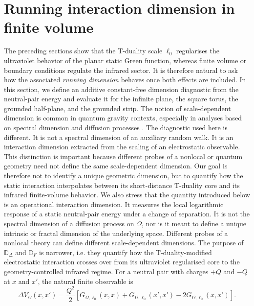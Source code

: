\documentclass[nopacs,amsmath,amsfonts,amssymb,aps,superscriptaddress]{revtex4}
\begin{document}
\section{Running interaction dimension in finite volume}
\label{sec:running_dimension}

The preceding sections show that the T-duality scale $\ell_0$ regularises the ultraviolet behavior of the planar static Green function, whereas finite volume or boundary conditions regulate the infrared sector. It is therefore natural to ask how the associated {\it{running dimension}} behaves once both effects are included. In this section, we define an additive constant-free dimension diagnostic from the neutral-pair energy and evaluate it for the infinite plane, the square torus, the grounded half-plane, and the grounded strip. The notion of scale-dependent dimension is common in quantum gravity contexts, especially in analyses based on spectral dimension and diffusion processes  \cite{AmbjornJurkiewiczLoll2005, Benedetti2009, Horava2009, ModestoNicolini2010, Carlip2019, Calcagni2017}. The diagnostic used here is different. It is not a spectral dimension of an auxiliary random walk. It is an interaction dimension extracted from the scaling of an electrostatic observable. This distinction is important because different probes of a nonlocal or quantum geometry need not define the same scale-dependent dimension. Our goal is therefore not to identify a unique geometric dimension, but to quantify how the static interaction interpolates between its short-distance T-duality core and its infrared finite-volume behavior.  We also stress that the quantity introduced below is an operational interaction dimension. It measures the local logarithmic response of a static neutral-pair energy under a change of separation. It is not the spectral dimension of a diffusion process on $\Omega$, nor is it meant to define a unique intrinsic or fractal dimension of the underlying space. Different probes of a nonlocal theory can define different scale-dependent dimensions. The purpose of $\mathbb D_\Delta$ and $\mathbb D_F$ is narrower, i.e. they quantify how the T-duality-modified electrostatic interaction crosses over from its ultraviolet regularised core to the geometry-controlled infrared regime. For a neutral pair with charges $+Q$ and $-Q$ at $x$ and $x'$, the natural finite observable is
\begin{equation}
  \Delta V_\Omega(x,x')=\frac{Q^2}{2}\left[G_{\Omega,\ell_0}(x,x)+G_{\Omega,\ell_0}(x',x') - 2G_{\Omega,\ell_0}(x,x')\right].
\end{equation}
\end{document}
